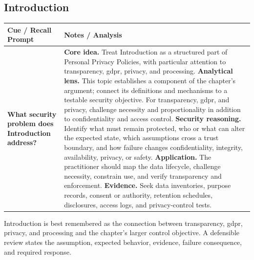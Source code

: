 \documentclass[11pt]{article}
\newcommand{\CornellHeader}{%
\rowcolor{Navy}\color{white}\bfseries Cue / Recall Prompt & \color{white}\bfseries Notes / Analysis\\\hline}
\newcommand{\CornellRow}[2]{%
\cellcolor{CueGray}\RaggedRight\textbf{#1} & \RaggedRight #2\\\hline}
\begin{document}
\subsection*{Introduction}
\begin{longtable}{>{\RaggedRight\arraybackslash}p{}|>{\RaggedRight\arraybackslash}p{}}
\CornellHeader
\CornellRow{What security problem does Introduction address?}{\textbf{Core idea.} Treat Introduction as a structured part of Personal Privacy Policies, with particular attention to transparency, gdpr, privacy, and processing. \textbf{Analytical lens.} This topic establishes a component of the chapter's argument; connect its definitions and mechanisms to a testable security objective. For transparency, gdpr, and privacy, challenge necessity and proportionality in addition to confidentiality and access control. \textbf{Security reasoning.} Identify what must remain protected, who or what can alter the expected state, which assumptions cross a trust boundary, and how failure changes confidentiality, integrity, availability, privacy, or safety. \textbf{Application.} The practitioner should map the data lifecycle, challenge necessity, constrain use, and verify transparency and enforcement. \textbf{Evidence.} Seek data inventories, purpose records, consent or authority, retention schedules, disclosures, access logs, and privacy-control tests.}
\end{longtable}
\begin{topicsummary}
Introduction is best remembered as the connection between transparency, gdpr, privacy, and processing and the chapter's larger control objective. A defensible review states the assumption, expected behavior, evidence, failure consequence, and required response.
\end{topicsummary}
\end{document}
